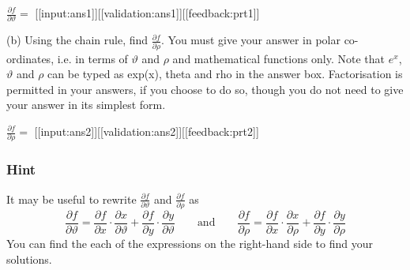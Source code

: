 \documentclass[a4paper,10pt]{article}
\begin{document}
\( \frac{\partial f}{\partial \vartheta} = \) [[input:ans1]][[validation:ans1]][[feedback:prt1]]

(b) Using the chain rule, find \( \frac{\partial f}{\partial \rho} \). You must give your answer in polar co-ordinates, i.e. in terms of \(\vartheta\) and $\rho$ and mathematical functions only. Note that $e^{x}$, \(\vartheta\) and \(\rho\) can be typed as exp(x), theta and rho in the answer box. Factorisation is permitted in your answers, if you choose to do so, though you do not need to give your answer in its simplest form.

\( \frac{\partial f}{\partial \rho} = \) [[input:ans2]][[validation:ans2]][[feedback:prt2]]
\subsubsection{Hint}
It may be useful to rewrite $\frac{\partial f}{\partial \vartheta}$ and $\frac{\partial f}{\partial \rho}$ as \[ \frac{\partial f}{\partial \vartheta} = \frac{\partial f}{\partial x}\cdot\frac{\partial x}{\partial \vartheta} + \frac{\partial f}{\partial y}\cdot\frac{\partial y}{\partial \vartheta} \qquad \text{and} \qquad \frac{\partial f}{\partial \rho} = \frac{\partial f}{\partial x}\cdot\frac{\partial x}{\partial \rho} + \frac{\partial f}{\partial y}\cdot\frac{\partial y}{\partial \rho} \] You can find the each of the expressions on the right-hand side to find your solutions.
\end{document}
